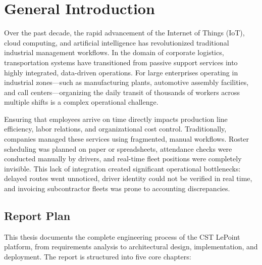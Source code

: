 \chapter*{General Introduction}

Over the past decade, the rapid advancement of the Internet of Things (IoT), cloud computing, and artificial intelligence has revolutionized traditional industrial management workflows. In the domain of corporate logistics, transportation systems have transitioned from passive support services into highly integrated, data-driven operations. For large enterprises operating in industrial zones—such as manufacturing plants, automotive assembly facilities, and call centers—organizing the daily transit of thousands of workers across multiple shifts is a complex operational challenge.

Ensuring that employees arrive on time directly impacts production line efficiency, labor relations, and organizational cost control. Traditionally, companies managed these services using fragmented, manual workflows. Roster scheduling was planned on paper or spreadsheets, attendance checks were conducted manually by drivers, and real-time fleet positions were completely invisible. This lack of integration created significant operational bottlenecks: delayed routes went unnoticed, driver identity could not be verified in real time, and invoicing subcontractor fleets was prone to accounting discrepancies.

\newpage

\section*{Report Plan}
This thesis documents the complete engineering process of the CST LePoint platform, from requirements analysis to architectural design, implementation, and deployment. The report is structured into five core chapters:

